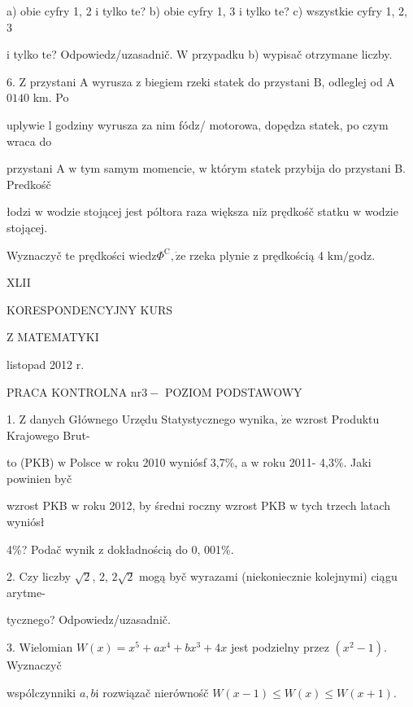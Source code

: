 \documentclass[a4paper,12pt]{article}
\begin{document}
a) obie cyfry 1, 2 $\mathrm{i}$ tylko $\mathrm{t}\mathrm{e}$? b) obie cyfry 1, 3 $\mathrm{i}$ tylko $\mathrm{t}\mathrm{e}$? c) wszystkie cyfry 1, 2, 3

$\mathrm{i}$ tylko $\mathrm{t}\mathrm{e}$? Odpowiedz/uzasadnič. $\mathrm{W}$ przypadku b) wypisač otrzymane liczby.

6. $\mathrm{Z}$ przystani A wyrusza $\mathrm{z}$ biegiem rzeki statek do przystani $\mathrm{B}$, odleglej od A $0140$ km. Po

uplywie l godziny wyrusza za nim fódz/ motorowa, dopędza statek, po czym wraca do

przystani A $\mathrm{w}$ tym samym momencie, $\mathrm{w}$ którym statek przybija do przystani B. Predkośč

łodzi $\mathrm{w}$ wodzie stojącej jest póltora raza większa $\mathrm{n}\mathrm{i}\dot{\mathrm{z}}$ prędkośč statku $\mathrm{w}$ wodzie stojącej.

Wyznaczyč te prędkości $\mathrm{w}\mathrm{i}\mathrm{e}\mathrm{d}\mathrm{z}\Phi^{\mathrm{C}}, \dot{\mathrm{z}}\mathrm{e}$ rzeka plynie $\mathrm{z}$ prędkością 4 $\mathrm{k}\mathrm{m}/$godz.





XLII

KORESPONDENCYJNY KURS

Z MATEMATYKI

listopad 2012 r.

PRACA KONTROLNA $\mathrm{n}\mathrm{r} 3-$ POZIOM PODSTAWOWY

1. $\mathrm{Z}$ danych Głównego Urzędu Statystycznego wynika, $\dot{\mathrm{z}}\mathrm{e}$ wzrost Produktu Krajowego Brut-

to (PKB) $\mathrm{w}$ Polsce $\mathrm{w}$ roku 2010 wyniósf 3,7\%, a $\mathrm{w}$ roku 2011- 4,3\%. Jaki powinien byč

wzrost PKB $\mathrm{w}$ roku 2012, by średni roczny wzrost PKB $\mathrm{w}$ tych trzech latach wyniósł

4\%? Podač wynik $\mathrm{z}$ dokładnością do 0, 001\%.

2. Czy liczby $\sqrt{2}$, 2, $2\sqrt{2}$ mogą byč wyrazami (niekoniecznie kolejnymi) ciągu arytme-

tycznego? Odpowiedz/uzasadnič.

3. Wielomian $W(x) = x^{5}+ax^{4}+bx^{3}+4x$ jest podzielny przez $(x^{2}-1)$. Wyznaczyč

wspólczynniki $a, b\mathrm{i}$ rozwiązač nierównośč $W(x-1)\leq W(x)\leq W(x+1).$
\end{document}
